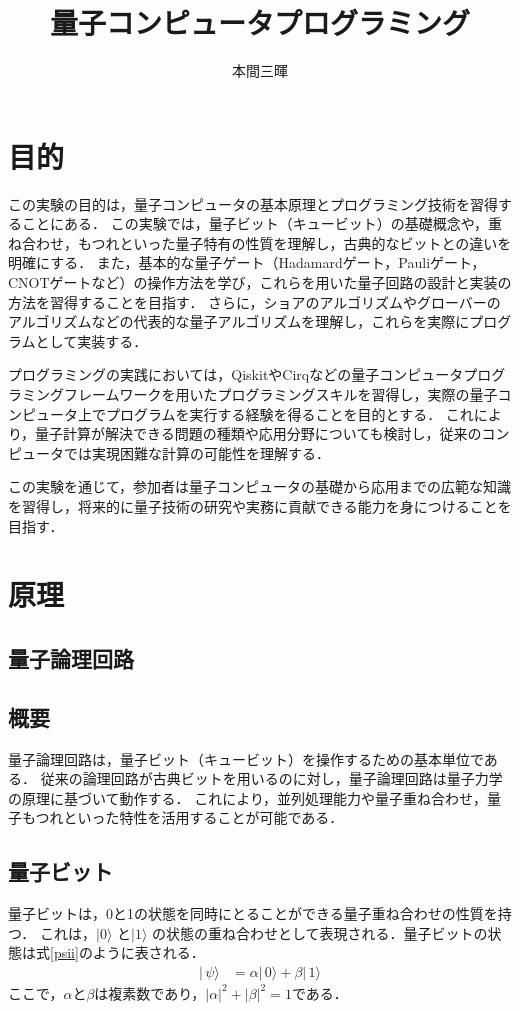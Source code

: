 \documentclass[titlepage,a4paper]{jsarticle}
\title{量子コンピュータプログラミング}
\author{本間三暉}
\begin{document}
\maketitle
\section{目的}
この実験の目的は，量子コンピュータの基本原理とプログラミング技術を習得することにある．
この実験では，量子ビット（キュービット）の基礎概念や，重ね合わせ，もつれといった量子特有の性質を理解し，古典的なビットとの違いを明確にする．
また，基本的な量子ゲート（Hadamardゲート，Pauliゲート，CNOTゲートなど）の操作方法を学び，これらを用いた量子回路の設計と実装の方法を習得することを目指す．
さらに，ショアのアルゴリズムやグローバーのアルゴリズムなどの代表的な量子アルゴリズムを理解し，これらを実際にプログラムとして実装する．

プログラミングの実践においては，QiskitやCirqなどの量子コンピュータプログラミングフレームワークを用いたプログラミングスキルを習得し，実際の量子コンピュータ上でプログラムを実行する経験を得ることを目的とする．
これにより，量子計算が解決できる問題の種類や応用分野についても検討し，従来のコンピュータでは実現困難な計算の可能性を理解する．

この実験を通じて，参加者は量子コンピュータの基礎から応用までの広範な知識を習得し，将来的に量子技術の研究や実務に貢献できる能力を身につけることを目指す．
\section{原理}
\subsection{量子論理回路}
\subsection*{概要}
量子論理回路は，量子ビット（キュービット）を操作するための基本単位である．
従来の論理回路が古典ビットを用いるのに対し，量子論理回路は量子力学の原理に基づいて動作する．
これにより，並列処理能力や量子重ね合わせ，量子もつれといった特性を活用することが可能である．

\subsection*{量子ビット}
量子ビットは，0と1の状態を同時にとることができる量子重ね合わせの性質を持つ．
これは，$|0\rangle$ と$|1\rangle$ の状態の重ね合わせとして表現される．量子ビットの状態は式\eqref{psii}のように表される．
\begin{align}
  |\,\psi \rangle & = \alpha|\,0\rangle + \beta|\,1\rangle \label{psii}
\end{align}
ここで，$\alpha$と$\beta$は複素数であり，$|\alpha|^2+|\beta|^2=1$である．
\end{document}
